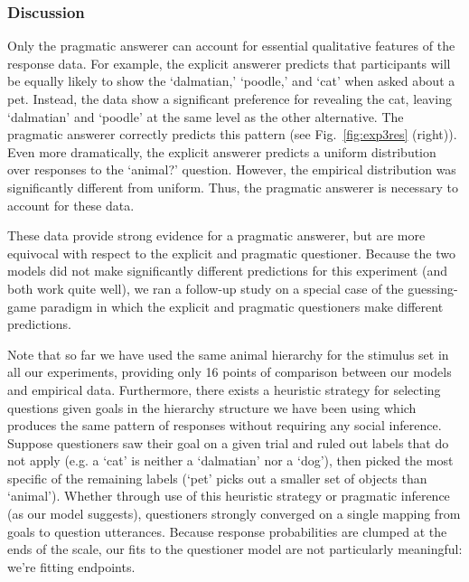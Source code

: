 \documentclass[12pt, floatsintext, jou]{apa6}
\begin{document}
\subsubsection{Discussion}

Only the pragmatic answerer can account for essential qualitative features of the response data. For example, the explicit answerer predicts that participants will be equally likely to show the `dalmatian,' `poodle,' and `cat' when asked about a pet. Instead, the data show a significant preference for revealing the cat, leaving `dalmatian' and `poodle' at the same level as the other alternative. The pragmatic answerer correctly predicts this pattern  (see Fig.~\ref{fig:exp3res} (right)). Even more dramatically, the explicit answerer predicts a uniform distribution over responses to the `animal?' question. %
However, the empirical distribution was significantly different from uniform. Thus, the pragmatic answerer is necessary to account for these data.

These data provide strong evidence for a pragmatic answerer, but are more equivocal with respect to the explicit and pragmatic questioner. Because the two models did not make significantly different predictions for this experiment (and both work quite well), we ran a follow-up study on a special case of the guessing-game paradigm in which the explicit and pragmatic questioners make different predictions.

Note that so far we have used the same animal hierarchy for the stimulus set in all our experiments, providing only 16 points of comparison between our models and empirical data. Furthermore, there exists a heuristic strategy for selecting questions given goals in the hierarchy structure we have been using which produces the same pattern of responses without requiring any social inference. Suppose questioners saw their goal on a given trial and ruled out labels that do not apply (e.g. a `cat' is neither a `dalmatian' nor a `dog'), then picked the most specific of the remaining labels (`pet' picks out a smaller set of objects than `animal'). Whether through use of this heuristic strategy or pragmatic inference (as our model suggests), questioners strongly converged on a single mapping from goals to question utterances. Because response probabilities are clumped at the ends of the scale, our fits to the questioner model are not particularly meaningful: we're fitting endpoints.
 
\end{document}
